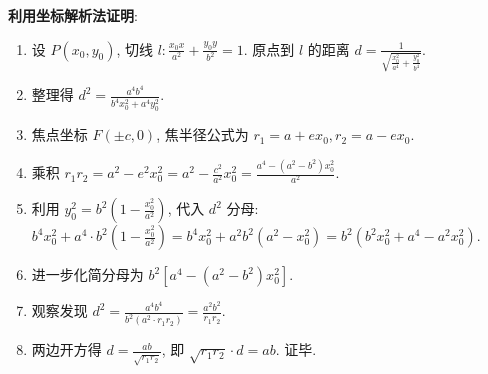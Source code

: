 \begin{proofbox}
\textbf{利用坐标解析法证明}:
\begin{enumerate}
    \item 设 $P(x_0, y_0)$, 切线 $l: \frac{x_0x}{a^2} + \frac{y_0y}{b^2} = 1$. 原点到 $l$ 的距离 $d = \frac{1}{\sqrt{\frac{x_0^2}{a^4} + \frac{y_0^2}{b^4}}}$.
    \item 整理得 $d^2 = \frac{a^4b^4}{b^4x_0^2 + a^4y_0^2}$. 
    \item 焦点坐标 $F(\pm c, 0)$, 焦半径公式为 $r_1 = a + ex_0, r_2 = a - ex_0$.
    \item 乘积 $r_1r_2 = a^2 - e^2x_0^2 = a^2 - \frac{c^2}{a^2}x_0^2 = \frac{a^4 - (a^2-b^2)x_0^2}{a^2}$.
    \item 利用 $y_0^2 = b^2(1 - \frac{x_0^2}{a^2})$, 代入 $d^2$ 分母:
    $b^4x_0^2 + a^4 \cdot b^2(1 - \frac{x_0^2}{a^2}) = b^4x_0^2 + a^2b^2(a^2 - x_0^2) = b^2(b^2x_0^2 + a^4 - a^2x_0^2)$.
    \item 进一步化简分母为 $b^2[a^4 - (a^2-b^2)x_0^2]$.
    \item 观察发现 $d^2 = \frac{a^4b^4}{b^2(a^2 \cdot r_1r_2)} = \frac{a^2b^2}{r_1r_2}$.
    \item 两边开方得 $d = \frac{ab}{\sqrt{r_1r_2}}$, 即 $\sqrt{r_1r_2} \cdot d = ab$. 证毕.
\end{enumerate}
\end{proofbox}